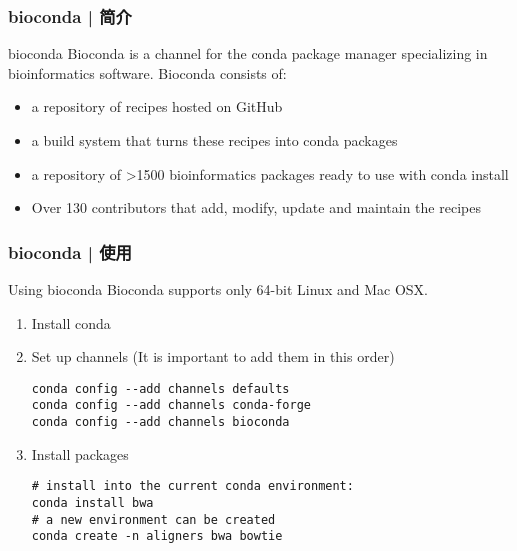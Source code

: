 \begin{frame}
  \frametitle{bioconda | 简介}
  \begin{block}{bioconda}
    Bioconda is a channel for the conda package manager specializing in bioinformatics software. Bioconda consists of:
    \begin{itemize}
      \item a repository of recipes hosted on GitHub
      \item a build system that turns these recipes into conda packages
      \item a repository of >1500 bioinformatics packages ready to use with conda install
      \item Over 130 contributors that add, modify, update and maintain the recipes
    \end{itemize}
  \end{block}
\end{frame}

\begin{frame}[fragile]
  \frametitle{bioconda | 使用}
  \begin{block}{Using bioconda}
    Bioconda supports only 64-bit Linux and Mac OSX.
    \begin{enumerate}
      \item Install conda
      \item Set up channels (It is important to add them in this order)
\vspace{-0.5em}
\begin{lstlisting}
conda config --add channels defaults
conda config --add channels conda-forge
conda config --add channels bioconda
\end{lstlisting}
\vspace{-0.8em}
      \item Install packages
\vspace{-0.5em}
\begin{lstlisting}
# install into the current conda environment:
conda install bwa
# a new environment can be created
conda create -n aligners bwa bowtie
\end{lstlisting}
    \end{enumerate}
  \end{block}
\end{frame}

